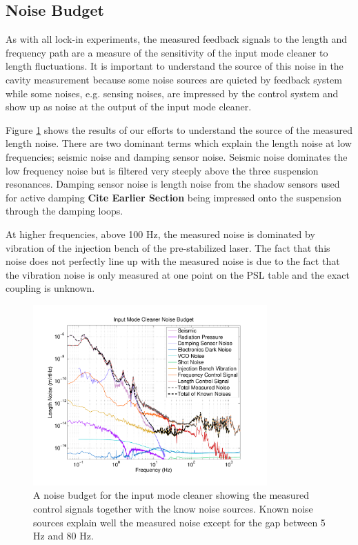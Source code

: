 \subsection{Noise Budget}
\label{sec:noise_budget}


As with all lock-in experiments, the measured feedback signals to the length and 
frequency path are a measure of the sensitivity of the input mode cleaner to length 
fluctuations.  
It is important to understand the source of this noise in the cavity measurement because 
some noise sources are quieted by feedback system while some noises, e.g. sensing noises, 
are impressed by the control system and show up
as noise at the output of the input mode cleaner.  

Figure \ref{fig:NoiseBudget} shows the results of our efforts to understand the source 
of the measured length noise.  
There are two dominant terms which explain the length noise at low frequencies; 
seismic noise and damping sensor noise.  
Seismic noise dominates the low frequency noise but is filtered very steeply above the 
three suspension resonances.  
Damping sensor noise is length noise from the shadow sensors used for active damping
\textbf{Cite Earlier Section} being impressed onto the suspension through the damping loops.  

At higher frequencies, above 100 Hz, the measured noise is dominated by vibration 
of the injection bench of the pre-stabilized laser.  
The fact that this noise does not perfectly line up with the measured noise is due 
to the fact that the vibration noise is only measured at one point on the PSL table 
and the exact coupling is unknown.  

\begin{figure}[htb]
	\centering
	\includegraphics[width = 0.8\textwidth,trim = 2.5cm 1.5cm 2.5cm 1.5cm]{IMC_Noise_Budget.pdf}
	\caption{A noise budget for the input mode cleaner showing the measured control 
		signals together with the know noise sources.  Known noise sources explain 
		well the measured noise except for the gap between 5 Hz and 80 Hz.}
	\label{fig:NoiseBudget}
\end{figure}

